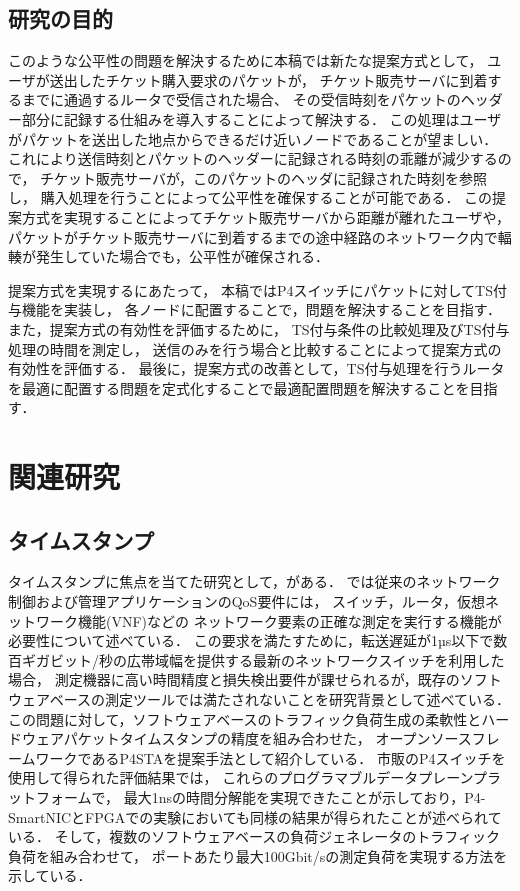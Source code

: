 \documentclass[a4j,11pt]{jreport}
\begin{document}
\section{研究の目的}
このような公平性の問題を解決するために本稿では新たな提案方式として，
ユーザが送出したチケット購入要求のパケットが，
チケット販売サーバに到着するまでに通過するルータで受信された場合、
その受信時刻をパケットのヘッダー部分に記録する仕組みを導入することによって解決する．
この処理はユーザがパケットを送出した地点からできるだけ近いノードであることが望ましい．
これにより送信時刻とパケットのヘッダーに記録される時刻の乖離が減少するので，
チケット販売サーバが，このパケットのヘッダに記録された時刻を参照し，
購入処理を行うことによって公平性を確保することが可能である．
この提案方式を実現することによってチケット販売サーバから距離が離れたユーザや，
パケットがチケット販売サーバに到着するまでの途中経路のネットワーク内で輻輳が発生していた場合でも，公平性が確保される．

提案方式を実現するにあたって，
本稿ではP4スイッチにパケットに対してTS付与機能を実装し，
各ノードに配置することで，問題を解決することを目指す．
また，提案方式の有効性を評価するために，
TS付与条件の比較処理及びTS付与処理の時間を測定し，
送信のみを行う場合と比較することによって提案方式の有効性を評価する．
最後に，提案方式の改善として，TS付与処理を行うルータを最適に配置する問題を定式化することで最適配置問題を解決することを目指す．

\chapter{関連研究}

\section{タイムスタンプ}
タイムスタンプに焦点を当てた研究として，\cite{P4STA}がある．
\cite{P4STA}では従来のネットワーク制御および管理アプリケーションのQoS要件には，
スイッチ，ルータ，仮想ネットワーク機能(VNF)などの
ネットワーク要素の正確な測定を実行する機能が必要性について述べている．
この要求を満たすために，転送遅延が1µs以下で数百ギガビット/秒の広帯域幅を提供する最新のネットワークスイッチを利用した場合，
測定機器に高い時間精度と損失検出要件が課せられるが，既存のソフトウェアベースの測定ツールでは満たされないことを研究背景として述べている．
この問題に対して，ソフトウェアベースのトラフィック負荷生成の柔軟性とハードウェアパケットタイムスタンプの精度を組み合わせた，
オープンソースフレームワークであるP4STAを提案手法として紹介している．
市販のP4スイッチを使用して得られた評価結果では，
これらのプログラマブルデータプレーンプラットフォームで，
最大1nsの時間分解能を実現できたことが示しており，P4-SmartNICとFPGAでの実験においても同様の結果が得られたことが述べられている．
そして，複数のソフトウェアベースの負荷ジェネレータのトラフィック負荷を組み合わせて，
ポートあたり最大100Gbit/sの測定負荷を実現する方法を示している．
\end{document}
